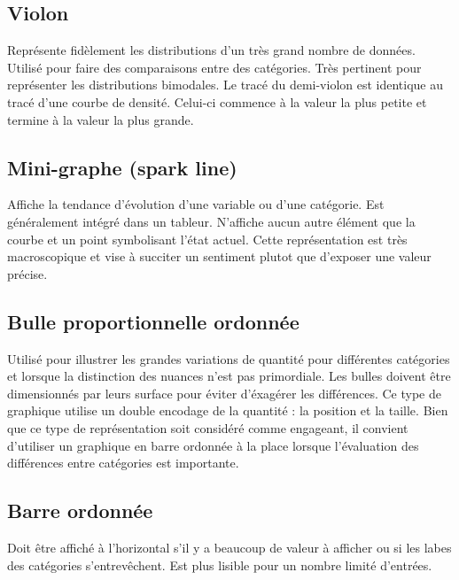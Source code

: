\documentclass[a4paper,12pt]{article}
\begin{document}
\begin{multicols}{2}
\subsection*{Violon}
\label{sec:orgcdcc21c}
Représente fidèlement les distributions d'un très grand nombre de données. \autocite{alansmithLexiqueVisuel} Utilisé pour faire des comparaisons entre des catégories. \autocite{mikeyiHowChooseRight2020}  Très pertinent pour représenter les distributions bimodales. \autocite{wilkeVisualizingManyDistributions2019} Le tracé du demi-violon est identique au tracé d'une courbe de densité. Celui-ci commence à la valeur la plus petite et termine à la valeur la plus grande.
\subsection*{Mini-graphe (spark line)}
\label{sec:org9f5388b}
Affiche la tendance d'évolution d'une variable ou d'une catégorie. Est généralement intégré dans un tableur. N'affiche aucun autre élément que la courbe et un point symbolisant l'état actuel. Cette représentation est très macroscopique et vise à succiter un sentiment plutot que d'exposer une valeur précise. \autocite{jonathanschwabishDistribution2021}
\subsection*{Bulle proportionnelle ordonnée}
\label{sec:org70ca390}
Utilisé pour illustrer les grandes variations de quantité pour différentes catégories et lorsque la distinction des nuances n'est pas primordiale. Les bulles doivent être dimensionnés par leurs surface pour éviter d'éxagérer les différences. \autocite{jonathanschwabishComparingCategories2021} Ce type de graphique utilise un double encodage de la quantité : la position et la taille. \autocite{wilkeVisualizingAssociationsTwo2019} Bien que ce type de représentation soit considéré comme engageant, il convient d'utiliser un graphique en barre ordonnée à la place lorsque l'évaluation des différences entre catégories est importante. \autocite{jonathanschwabishComparingCategories2021}
\subsection*{Barre ordonnée}
\label{sec:orgbda5b36}
Doit être affiché à l'horizontal s'il y a beaucoup de valeur à afficher ou si les labes des catégories s'entrevêchent. \autocite{alansmithLexiqueVisuel} Est plus lisible pour un nombre limité d'entrées. \autocite{mikeyiHowChooseRight2020}

\end{multicols}
\end{document}
